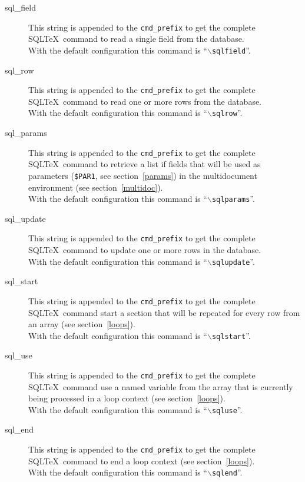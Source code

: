 \documentclass{article}
\newcommand{\bs}{\ensuremath{\backslash}}
\begin{document}
\begin{description}
\item[sql\_field] This string is appended to the \texttt{cmd\_prefix} to
get the complete SQL\TeX\ command to read a single field from the database.\\
With the default configuration this command is ``\texttt{\bs sqlfield}''.

\item[sql\_row] This string is appended to the \texttt{cmd\_prefix} to
get the complete SQL\TeX\ command to read one or more rows from the database.\\
With the default configuration this command is ``\texttt{\bs sqlrow}''.

\item[sql\_params] This string is appended to the \texttt{cmd\_prefix} to get the complete SQL\TeX\ command to retrieve a list if fields that will be used as parameters (\texttt{\$PAR1}, see section~\ref{params}) in the multidocument environment (see section~\ref{multidoc}).\\
With the default configuration this command is ``\texttt{\bs sqlparams}''.

\item[sql\_update] This string is appended to the \texttt{cmd\_prefix}
to get the complete SQL\TeX\ command to update one or more rows in the database.\\
With the default configuration this command is ``\texttt{\bs sqlupdate}''.

\item[sql\_start] This string is appended to the \texttt{cmd\_prefix} to get the complete SQL\TeX\ command start a section that will be repeated for every row from an array (see section~\ref{loops}).\\
With the default configuration this command is ``\texttt{\bs sqlstart}''.

\item[sql\_use] This string is appended to the \texttt{cmd\_prefix} to get the complete SQL\TeX\ command use a named variable from the array that is currently being processed in a loop context (see section~\ref{loops}).\\
With the default configuration this command is ``\texttt{\bs sqluse}''.

\item[sql\_end] This string is appended to the \texttt{cmd\_prefix} to get the complete SQL\TeX\ command to end a loop context (see section~\ref{loops}).\\
With the default configuration this command is ``\texttt{\bs sqlend}''.


\end{description}
\end{document}
